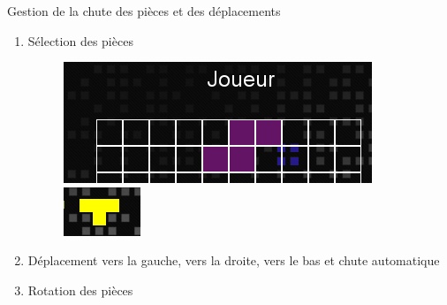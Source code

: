 \documentclass{beamer}
\begin{document}
	
	\begin{frame}{Gestion de la chute des pièces et des déplacements}
	
		\begin{enumerate}
		
			\item Sélection des pièces
			
			\begin{figure}[t]
			
        	\includegraphics[scale=0.4]{images/Piece.PNG}\hfill
        	\includegraphics[scale=0.5]{images/piece_suivante.PNG}
        	
			\end{figure}
			
			\item Déplacement vers la gauche, vers la droite, vers le bas et chute automatique
			\newline
			
			\item Rotation des pièces
			\begin{figure}[t]
			

\end{figure}
\end{enumerate}
\end{frame}
\end{document}
